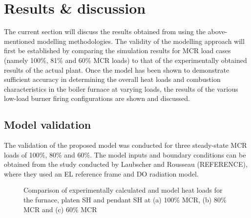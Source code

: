 \documentclass[review]{elsarticle}
\begin{document}
\section{Results \& discussion}
The current section will discuss the results obtained from using the above-mentioned modelling methodologies. The validity of the modelling approach will first be established by comparing the simulation results for MCR load cases (namely 100\%, 81\% and 60\% MCR loads) to that of the experimentally obtained results of the actual plant. Once the model has been shown to demonstrate sufficient accuracy in determining the overall heat loads and combustion characteristics in the boiler furnace at varying loads, the results of the various low-load burner firing configurations are shown and discussed.

\subsection{Model validation}

The validation of the proposed model was conducted for three steady-state MCR loads of 100\%, 80\% and 60\%. The model inputs and boundary conditions can be obtained from the study conducted by Laubscher and Rousseau (REFERENCE), where they used an EL reference frame and DO radiation model.

\begin{figure}[h!]
\label{fig_heat_valid}
\caption{Comparison of experimentally calculated and model heat loads for the furnace, platen SH and pendant SH at (a) 100\% MCR, (b) 80\% MCR and (c) 60\% MCR}
\end{figure}
\end{document}
